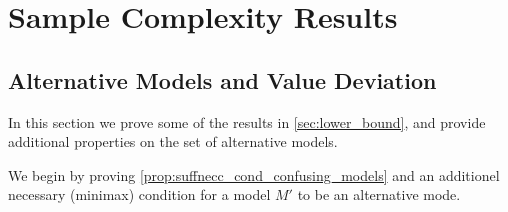 \section{Sample Complexity Results}\label{app:sec:lower_bound}

\subsection{Alternative Models and Value Deviation}\label{app:subsec:confusing_models}
In this section we prove some of the results in \cref{sec:lower_bound}, and provide additional properties on the set of alternative models.

We begin by proving \cref{prop:suffnecc_cond_confusing_models} and an additionel necessary (minimax) condition for a model $M'$ to be an alternative mode.

